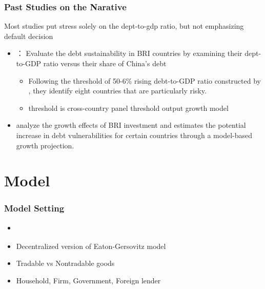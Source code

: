 \documentclass[mathserif]{beamer}
\begin{document}
    \begin{frame}
        \frametitle{Past Studies on the Narative}
            Most studies put stress solely on the dept-to-gdp ratio, but not emphasizing default decision
            \vfill
            \pause
            \begin{itemize}
            \item \citet{Hurley19-8-debt-trap}：
            Evaluate the debt sustainability in
BRI countries by examining their dept-to-GDP ratio versus their share of China’s debt
                \begin{itemize}
                    \item Following the threshold of 50-6\% rising debt-to-GDP ratio constructed by \citet{Chudik-15}, they identify eight countries that are particularly risky.
                    \item threshold is cross-country panel threshold output growth model
                \end{itemize}
            \pause
            \item \citet{Bandiera-Vasileios-BRI-debt} analyze the growth effects of BRI investment and estimates the potential increase in debt vulnerabilities for certain countries through a model-based growth projection.
            \end{itemize}
    \end{frame}
    \section{Model}
    \begin{frame}
        \frametitle{Model Setting}

        \begin{itemize}
            \item \citet{Na-18}
            \item Decentralized version of Eaton-Gersovitz model
            \item Tradable vs Nontradable goods
            \item Household, Firm, Government, Foreign lender
        \end{itemize}

    \end{frame}
\end{document}
